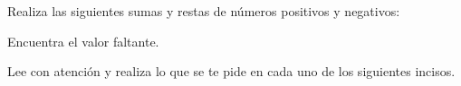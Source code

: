 \documentclass[11pt,addpoints]{exam}
\begin{document}
\begin{questions}
  \begin{parts}
    
    
  \end{parts}

  \question[10] Realiza las siguientes sumas y restas de n\'umeros positivos y negativos:
  \begin{parts}
    
    
  \end{parts}

  \question[10] Encuentra el valor faltante.
  \begin{multicols}{2}
    \begin{parts}
      
      
    \end{parts}
  \end{multicols}

  \question[10] Lee con atenci\'on y realiza lo que se te pide en cada uno de los siguientes incisos.
  \begin{multicols}{2}
    \begin{parts}
      
      
    \end{parts}
  \end{multicols}
\end{questions}
\end{document}
